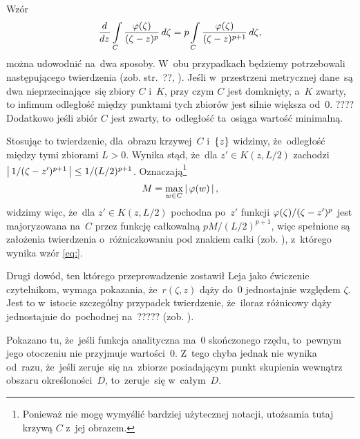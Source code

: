 \documentclass[a4paper,11pt]{article}
\begin{document}
\vspace{\spaceFour}


\start {} Wzór
\begin{equation}
  \label{eq:Leja-39}
  \frac{ d^{   } {   } }{ d {  z  }^{   } } \int\limits_{ C } \frac{ \varphi( \zeta ) }{ ( \zeta - z )^{ p } }\,
  d\zeta
  = p \int\limits_{ C } \frac{ \varphi( \zeta ) }{ ( \zeta - z )^{ p + 1 } }\, d\zeta,
\end{equation}
można udowodnić na~dwa sposoby. W~obu przypadkach będziemy
potrzebowali następującego twierdzenia (zob. str.~??, \cite{}). Jeśli
w~przestrzeni metrycznej dane~są dwa nieprzecinające~się zbiory $C$
i~$K$, przy czym $C$ jest domknięty, a~$K$ zwarty, to infimum
odległość między punktami tych zbiorów jest silnie większa od~0. ????
Dodatkowo jeśli zbiór $C$ jest zwarty, to~odległość ta~osiąga wartość
minimalną.

Stosując to twierdzenie, dla~obrazu krzywej~$C$ i~$\{  z  \}$ widzimy,
że~odległość między tymi zbiorami $L > 0$. Wynika stąd, że~dla
$z' \in K( z, L / 2 )$ zachodzi
$\left| \,  1 / ( \zeta - z' )^{ p + 1 }  \, \right| \leq 1 / ( L / 2 )^{ p + 1 }$.
Oznaczają\footnote{Ponieważ nie mogę wymyślić bardziej użytecznej
  notacji, utożsamia tutaj krzywą $C$ z~jej obrazem.}
\begin{equation}
  \label{eq:Leja-40}
  M = \max_{ w \in C } \left| \,  \varphi( w )  \, \right|,
\end{equation}
widzimy więc, że~dla $z' \in K( z, L / 2 )$ pochodna po~$z'$ funkcji
$\varphi( \zeta ) / ( \zeta - z' )^{ p }$ jest majoryzowana na~$C$ przez
funkcję całkowalną $p M / ( L / 2 )^{ p + 1 }$, więc spełnione są
założenia twierdzenia o~różniczkowaniu pod znakiem całki (zob.
\cite{}), z~którego wynika wzór \eqref{eq:}.

Drugi dowód, ten którego przeprowadzenie zostawił Leja jako ćwiczenie
czytelnikom, wymaga pokazania, że~$r( \zeta, z )$ dąży do~0
jednostajnie względem $\zeta$. Jest to w~istocie szczególny przypadek
twierdzenie, że~iloraz różnicowy dąży jednostajnie do~pochodnej
na~????? (zob. \cite{}).

\vspace{\spaceFour}


\start {} Pokazano tu, że~jeśli funkcja analityczna ma~0
skończonego rzędu, to~pewnym jego otoczeniu nie przyjmuje wartości~0.
Z~tego chyba jednak nie wynika od~razu, że~jeśli zeruje~się na~zbiorze
posiadającym punkt skupienia wewnątrz obszaru określoności~$D$,
to~zeruje~się w~całym~$D$.
\end{document}
